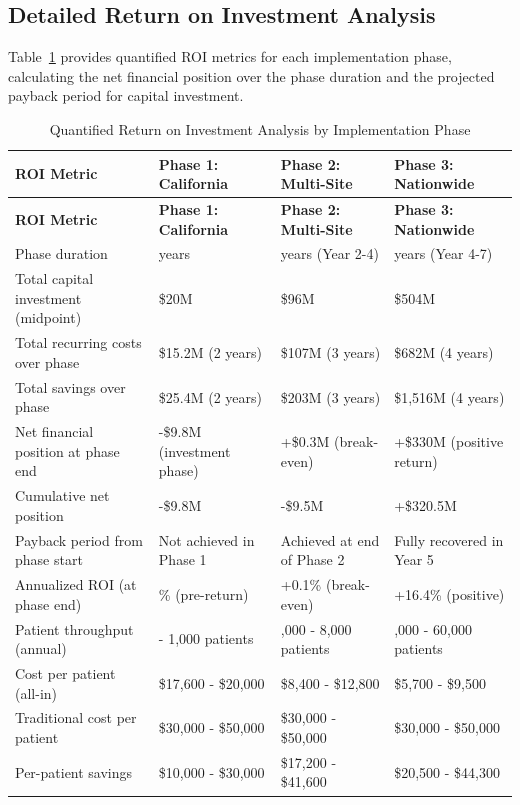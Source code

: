 \subsection{Detailed Return on Investment Analysis}
\label{subsec:financial-detailed-roi}

Table~\ref{tab:detailed-roi-analysis} provides quantified ROI metrics for
each implementation phase, calculating the net financial position over the
phase duration and the projected payback period for capital investment.

\begin{longtable}{l >{\raggedright\arraybackslash}p{3.2cm} >{\raggedright\arraybackslash}p{3.2cm} >{\raggedright\arraybackslash}p{3.2cm}}
\caption{Quantified Return on Investment Analysis by Implementation Phase}
\label{tab:detailed-roi-analysis} \\
\toprule
\textbf{ROI Metric} & \textbf{Phase 1: California} & \textbf{Phase 2: Multi-Site} & \textbf{Phase 3: Nationwide} \\
\midrule
\endfirsthead
\toprule
\textbf{ROI Metric} & \textbf{Phase 1: California} & \textbf{Phase 2: Multi-Site} & \textbf{Phase 3: Nationwide} \\
\midrule
\endhead
\bottomrule
\endfoot
\bottomrule
\endlastfoot
Phase duration & 2 years & 3 years (Year 2-4) & 4 years (Year 4-7) \\
\midrule
Total capital investment (midpoint) & \$20M & \$96M & \$504M \\
\midrule
Total recurring costs over phase & \$15.2M (2 years) & \$107M (3 years) & \$682M (4 years) \\
\midrule
Total savings over phase & \$25.4M (2 years) & \$203M (3 years) & \$1,516M (4 years) \\
\midrule
Net financial position at phase end & -\$9.8M (investment phase) & +\$0.3M (break-even) & +\$330M (positive return) \\
\midrule
Cumulative net position & -\$9.8M & -\$9.5M & +\$320.5M \\
\midrule
Payback period from phase start & Not achieved in Phase 1 & Achieved at end of Phase 2 & Fully recovered in Year 5 \\
\midrule
Annualized ROI (at phase end) & -24.5\% (pre-return) & +0.1\% (break-even) & +16.4\% (positive) \\
\midrule
Patient throughput (annual) & 500 - 1,000 patients & 3,000 - 8,000 patients & 20,000 - 60,000 patients \\
\midrule
Cost per patient (all-in) & \$17,600 - \$20,000 & \$8,400 - \$12,800 & \$5,700 - \$9,500 \\
\midrule
Traditional cost per patient & \$30,000 - \$50,000 & \$30,000 - \$50,000 & \$30,000 - \$50,000 \\
\midrule
Per-patient savings & \$10,000 - \$30,000 & \$17,200 - \$41,600 & \$20,500 - \$44,300 \\
\end{longtable}

